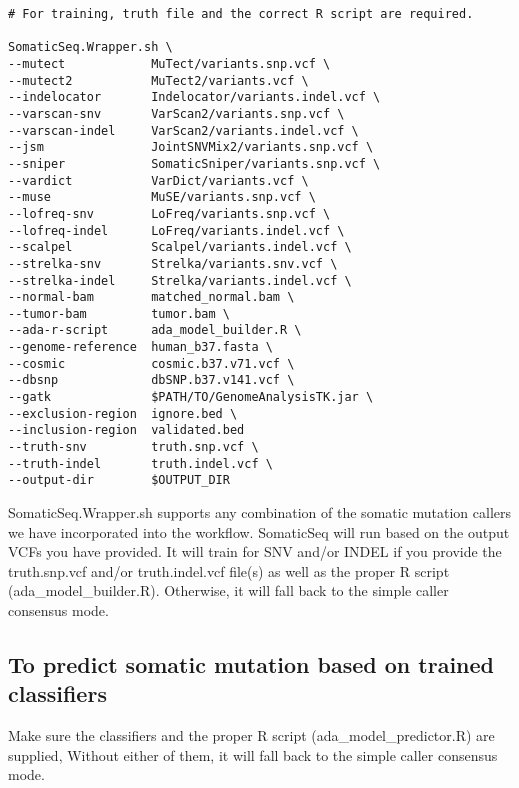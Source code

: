 \documentclass[10pt,letterpaper]{article}
\begin{document}
\begin{sloppypar}
\begin{lstlisting}
# For training, truth file and the correct R script are required.

SomaticSeq.Wrapper.sh \
--mutect            MuTect/variants.snp.vcf \
--mutect2           MuTect2/variants.vcf \
--indelocator       Indelocator/variants.indel.vcf \
--varscan-snv       VarScan2/variants.snp.vcf \
--varscan-indel     VarScan2/variants.indel.vcf \
--jsm               JointSNVMix2/variants.snp.vcf \
--sniper            SomaticSniper/variants.snp.vcf \
--vardict           VarDict/variants.vcf \
--muse              MuSE/variants.snp.vcf \
--lofreq-snv        LoFreq/variants.snp.vcf \
--lofreq-indel      LoFreq/variants.indel.vcf \
--scalpel           Scalpel/variants.indel.vcf \
--strelka-snv       Strelka/variants.snv.vcf \
--strelka-indel     Strelka/variants.indel.vcf \
--normal-bam        matched_normal.bam \
--tumor-bam         tumor.bam \
--ada-r-script      ada_model_builder.R \
--genome-reference  human_b37.fasta \
--cosmic            cosmic.b37.v71.vcf \
--dbsnp             dbSNP.b37.v141.vcf \
--gatk              $PATH/TO/GenomeAnalysisTK.jar \
--exclusion-region  ignore.bed \
--inclusion-region  validated.bed
--truth-snv         truth.snp.vcf \
--truth-indel       truth.indel.vcf \
--output-dir        $OUTPUT_DIR
\end{lstlisting}

SomaticSeq.Wrapper.sh supports any combination of the somatic mutation callers we have incorporated into the workflow. SomaticSeq will run based on the output VCFs you have provided. It will train for SNV and/or INDEL if you provide the truth.snp.vcf and/or truth.indel.vcf file(s) as well as the proper R script (ada\_model\_builder.R). Otherwise, it will fall back to the simple caller consensus mode.




\subsection{To predict somatic mutation based on trained classifiers}

Make sure the classifiers and the proper R script (ada\_model\_predictor.R) are supplied, Without either of them, it will fall back to the simple caller consensus mode.



\end{sloppypar}
\end{document}
